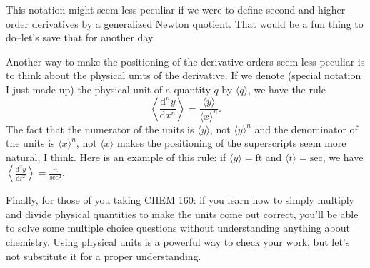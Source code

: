 \documentclass[12pt,fleqn,answers]{exam}
\begin{document}
This
notation might seem less peculiar if we were to define second and
higher order derivatives by a generalized Newton quotient. That 
would be a fun thing to do--let's save that for another day.

Another way to make the positioning of the derivative orders
seem less peculiar is to think about the physical units of 
the derivative. If we denote (special notation I just made up)
the physical unit of a quantity $q$ by $\langle q \rangle$, we 
have the rule
\[
    \left \langle \frac{\mathrm{d}^n y}{\mathrm{d} x^n} \right \rangle
    = \frac{ \langle y \rangle}{ \langle x \rangle^n }.
\]
The fact that the numerator of the units is \(\langle y \rangle\),
not \(\langle y \rangle^n\) and the denominator of the units is 
\(\langle x \rangle^n\), not \(\langle x \rangle\) makes the 
positioning of the superscripts seem more natural, I think.
Here is an example of this rule: if $\langle y \rangle = \mbox{ft}$ 
and \(\langle t \rangle = \mbox{sec}\), we have
\(\left \langle \frac{\mathrm{d}^2 y}{\mathrm{d} t^2} \right \rangle
    = \frac{ \mbox{ft}}{\mbox{sec}^2 }\).

Finally, for those of you taking CHEM 160: if you learn
how to simply multiply and divide physical quantities to
make the units come out correct, you'll be able to solve 
some multiple choice questions without understanding 
anything about chemistry. Using physical units is a
powerful way to check your work, but let's not substitute
it for a proper understanding.
\end{document}
